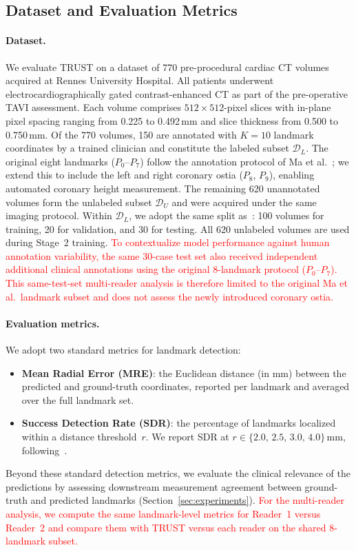 \documentclass[conference]{IEEEtran}
\begin{document}
\subsection{Dataset and Evaluation Metrics}
\label{sec:dataset}

\paragraph{Dataset.}
We evaluate TRUST on a dataset of 770 pre-procedural cardiac CT volumes acquired at Rennes University Hospital. All patients underwent electrocardiographically gated contrast-enhanced CT as part of the pre-operative TAVI assessment. Each volume comprises $512 \times 512$-pixel slices with in-plane pixel spacing ranging from 0.225 to 0.492\,mm and slice thickness from 0.500 to 0.750\,mm. Of the 770 volumes, 150 are annotated with $K = 10$ landmark coordinates by a trained clinician and constitute the labeled subset $\mathcal{D}_L$. The original eight landmarks ($P_0$--$P_7$) follow the annotation protocol of Ma et al.~\cite{Ma2023_aortic_landmarks}; we extend this to include the left and right coronary ostia ($P_8$, $P_9$), enabling automated coronary height measurement. The remaining 620 unannotated volumes form the unlabeled subset $\mathcal{D}_U$ and were acquired under the same imaging protocol. Within $\mathcal{D}_L$, we adopt the same split as~\cite{Ma2023_aortic_landmarks}: 100 volumes for training, 20 for validation, and 30 for testing. All 620 unlabeled volumes are used during Stage~2 training. \textcolor{red}{To contextualize model performance against human annotation variability, the same 30-case test set also received independent additional clinical annotations using the original 8-landmark protocol ($P_0$--$P_7$). This same-test-set multi-reader analysis is therefore limited to the original Ma et al.\ landmark subset and does not assess the newly introduced coronary ostia.}


\paragraph{Evaluation metrics.}
We adopt two standard metrics for landmark detection:
\begin{itemize}
  \item \textbf{Mean Radial Error (MRE)}: the Euclidean distance (in mm) between the predicted and ground-truth coordinates, reported per landmark and averaged over the full landmark set.
  \item \textbf{Success Detection Rate (SDR)}: the percentage of landmarks localized within a distance threshold~$r$. We report SDR at $r \in \{2.0,\, 2.5,\, 3.0,\, 4.0\}$\,mm, following~\cite{Ma2023_aortic_landmarks}.
\end{itemize}
Beyond these standard detection metrics, we evaluate the clinical relevance of the predictions by assessing downstream measurement agreement between ground-truth and predicted landmarks (Section~\ref{sec:experiments}). \textcolor{red}{For the multi-reader analysis, we compute the same landmark-level metrics for Reader~1 versus Reader~2 and compare them with TRUST versus each reader on the shared 8-landmark subset.}
\end{document}
